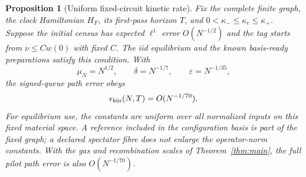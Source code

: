\documentclass[11pt]{article}
\newtheorem{proposition}[theorem]{Proposition}
\theoremstyle{definition}\newtheorem{definition}[theorem]{Definition}
\theoremstyle{remark}\newtheorem{remark}[theorem]{Remark}
\begin{document}
\begin{proposition}[Uniform fixed-circuit kinetic rate]\label{kin:rate}
Fix the complete finite graph, the clock Hamiltonian $H_F$, its first-pass
horizon $T$, and $0<\kappa_-\le\kappa_e\le\kappa_+$.  Suppose the
initial census has expected $\ell^1$ error $O(N^{-1/2})$ and the tag starts
from $\nu\le Cw(0)$ with fixed $C$.  The iid equilibrium and the known
basis-ready preparations satisfy this condition.  With
\[
 \mu_N=N^{1/2},\qquad \delta=N^{-1/7},\qquad
 \varepsilon=N^{-1/35},
\]
the signed-queue path error obeys
\begin{equation}\label{kin:explicit-rate}
 \epsilon_{\rm kin}(N,T)=O(N^{-1/70}).
\end{equation}
For equilibrium use, the constants are uniform over all normalized inputs
on this fixed material space.  A reference included in the configuration
basis is part of the fixed graph; a declared spectator fibre does not
enlarge the operator-norm constants.  With the gas and recombination scales
of Theorem~\ref{thm:main}, the full pilot path error is also $O(N^{-1/70})$.
\end{proposition}
\end{document}
